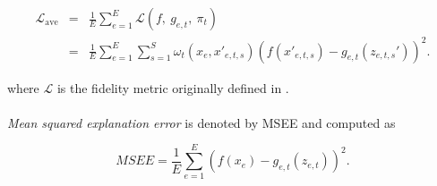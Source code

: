 \documentclass[AMS,STIX2COL]{WileyNJD-v2}\usepackage[]{graphicx}\usepackage[]{color}
\begin{document}
\begin{eqnarray*} \mathcal{L}_{\mbox{ave}} & = & \frac{1}{E}\sum_{e=1}^E\mathcal{L}(f, \ g_{e,t}, \ \pi_{t}) \\ & = & \frac{1}{E}\sum_{e=1}^E\sum_{s=1}^{S}\omega_{t}\left(x_e, x'_{e,t,s}\right)\left(f\left(x'_{e,t,s}\right)-g_{e,t}\left(z_{e,t,s}'\right)\right)^2. \end{eqnarray*}

\noindent where $\mathcal{L}$ is the fidelity metric originally defined in \citet{ribeiro:2016}.\\
\\
\emph{Mean squared explanation error} is denoted by MSEE and computed as

$$MSEE=\frac{1}{E}\sum_{e=1}^E\left(f\left(x_e\right)-g_{e,t}\left(z_{e,t}\right)\right)^2.$$
\end{document}
